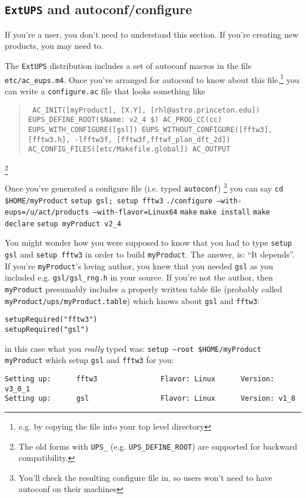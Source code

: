 \documentclass{article}
\newcommand{\code}[1]{\texttt{#1}}
\newcommand{\file}[1]{\texttt{#1}}
\newcommand{\eups}{\code{ExtUPS}}
\begin{document}
\subsection{\eups{} and autoconf/configure}
\label{autoconf}

If you're a user, you don't need to understand this section. If
you're creating new products, you may need to.

The \eups{} distribution includes a set of autoconf macros
in the file \file{etc/ac\_eups.m4}. Once you've arranged for
autoconf to know about this file,\footnote{e.g. by copying the
  file into your top level directory} you can write a
\file{configure.ac} file that looks something like
\begin{quote}
\obeylines\tt\small\parskip=0pt
AC\_INIT([myProduct], [X.Y], [rhl@astro.princeton.edu])
EUPS\_DEFINE\_ROOT(\${Name}: v2\_4 \$)
AC\_PROG\_CC(cc)
EUPS\_WITH\_CONFIGURE([gsl])
EUPS\_WITHOUT\_CONFIGURE([fftw3], [fftw3.h], -lfftw3f, [fftw3f,fftwf\_plan\_dft\_2d])
AC\_CONFIG\_FILES([etc/Makefile.global])
AC\_OUTPUT
\end{quote}
\footnote{The old forms with \code{UPS\_} (e.g. \code{UPS\_DEFINE\_ROOT})
  are supported for backward compatibility.}

Once you've generated a configure file (i.e. typed \code{autoconf})%
\footnote{You'll check the resulting configure file in, so users won't
  need to have autoconf on their machines}
you can say\hfil\break
\code{cd \$HOME/myProduct}\hfil\break
\code{setup gsl; setup fftw3}\hfil\break
\code{./configure --with-eups=/u/act/products --with-flavor=Linux64}\hfil\break
\code{make}\hfil\break
\code{make install}\hfil\break
\code{make declare}\hfil\break
\code{setup myProduct v2\_4}\hfil\break

You might wonder how you were supposed to know that you had to type
\code{setup gsl} and \code{setup fftw3} in order to build
\code{myProduct}. The answer, is: ``It depends''.  If you're
\code{myProduct}'s loving author, you knew that you needed
\code{gsl} as you included e.g. \code{gsl/gsl\_rng.h} in your
source. If you're not the author, then \code{myProduct} presumably
includes a properly written table file (probably called
\code{myProduct/ups/myProduct.table}) which knows about
\code{gsl} and \code{fftw3}:
\begin{verbatim}
setupRequired("fftw3")
setupRequired("gsl")
\end{verbatim}
in this case what you \textit{really} typed was:\hfil\break
\code{setup --root \$HOME/myProduct myProduct}\hfil\break
which setup \code{gsl} and \code{fftw3} for you:
\begin{verbatim}
Setting up:      fftw3               Flavor: Linux      Version: v3_0_1
Setting up:      gsl                 Flavor: Linux      Version: v1_8
\end{verbatim}
\end{document}

